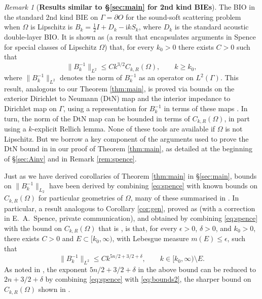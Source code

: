 \documentclass{birkjour}
\theoremstyle{definition}
\theoremstyle{remark}
\newtheorem{remark}[theorem]{Remark}
\numberwithin{equation}{section}
\newcommand{\ri}{\mathrm{i}}
\begin{document}
\begin{remark}[\bf Results similar to \S\ref{sec:main} for 2nd kind BIEs]
The BIO in the standard 2nd kind BIE on $\Gamma = \partial O$ for the sound-soft scattering problem when $\Omega$ is Lipschitz is $B_k=\frac{1}{2}I+D_k-\ri k S_k$, where $D_k$ is the standard acoustic double-layer BIO. It is shown as \cite[Lemma 6.2]{chandler2020high} (a result that encapsulates arguments in Spence \cite{spence2014wavenumber} for special classes of Lipschitz $\Omega$) that, for every $k_0>0$ there exists $C>0$ such that 
\begin{equation} \label{eq:spence}
\|B_k^{-1}\|_{L^2}\leq Ck^{3/2}C_{k,R}(\Omega), \qquad k\geq k_0,
\end{equation}
where $\|B_k^{-1}\|_{L^2}$ denotes the norm of $B_k^{-1}$ as an operator on $L^2(\Gamma)$. This result, analogous to our Theorem \ref{thm:main}, is proved via bounds on the exterior Dirichlet to Neumann (DtN) map and the interior impedance to Dirichlet map on $\Gamma$, using a representation for $B_k^{-1}$ in terms of these maps \cite[Thm.~2.33]{chandler2012numerical}. In turn, the norm of the DtN map can be bounded in terms of $C_{k,R}(\Omega)$\cite{spence2014wavenumber,chandler2020high}, in part using a $k$-explicit Rellich lemma. None of these tools are available if $\Omega$ is not Lipschitz. But we borrow a key component of the arguments used to prove the DtN bound in \cite[\S3]{spence2014wavenumber} in our proof of Theorem \ref{thm:main}, as detailed at the beginning of \S\ref{sec:Ainv} and in Remark \ref{rem:spence}. 

Just as we have derived corollaries of Theorem \ref{thm:main} in \S\ref{sec:main}, bounds on $\|B_k^{-1}\|_{L_2}$ have been derived by combining \eqref{eq:spence} with known bounds on $C_{k,R}(\Omega)$ for particular geometries of $\Omega$, many of these summarised in \cite[Table 6.1]{chandler2020high}. In particular, a result analogous to Corollary \ref{cor:gen}, proved as \cite[Cor.~2.8]{lafontaine2021most} (with a correction in E.~A.~Spence, private communication), and obtained by combining \eqref{eq:spence} with the bound on $C_{k,R}(\Omega)$ that is \cite[Thm.~1.1]{lafontaine2021most}, is that, for every $\epsilon>0$, $\delta>0$, and $k_0>0$, there exists $C>0$ and $E\subset [k_0,\infty)$, with Lebesgue measure $m(E)\leq \epsilon$, such that 
$$
\|B_k^{-1}\|_{L^2} \leq C k^{5n/2+3/2+\delta}, \qquad k\in [k_0,\infty)\setminus E.
$$
As noted in \cite{SiavashSimon1}, the exponent $5n/2+3/2+\delta$ in the above bound can be reduced to $2n+3/2+\delta$ by combining \eqref{eq:spence} with \eqref{eq:bounds2}, the sharper bound on $C_{k,R}(\Omega)$ shown in \cite{SiavashSimon1}.
\end{remark}
\end{document}
